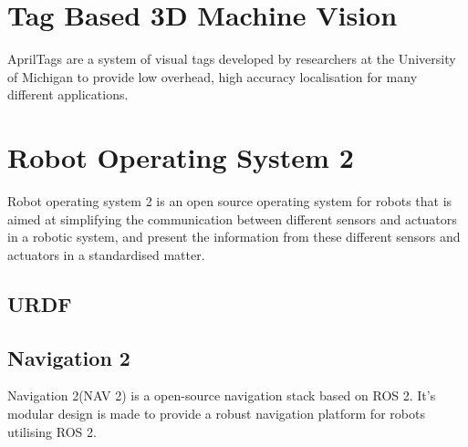 \section{Tag Based 3D Machine Vision}\label{sec:T:TagBased3DMachineVision}
AprilTags are a system of visual tags developed by researchers at the University of Michigan to provide low overhead, high accuracy localisation for many different applications. 

\section{Robot Operating System 2}
Robot operating system 2 is an open source operating system for robots that is aimed at simplifying the communication between different sensors and actuators in a robotic system, and present the information from these different sensors and actuators in a standardised matter.

\subsection{URDF}


\subsection{Navigation 2}
Navigation 2(NAV 2) is a open-source navigation stack based on ROS 2. It's modular design is made to provide a robust navigation platform for robots utilising ROS 2.
